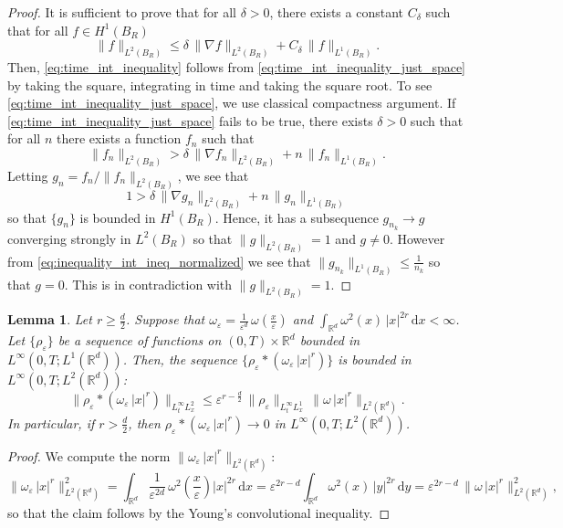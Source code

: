 \documentclass[reqno, 11pt]{amsart}
\numberwithin{equation}{section}
\newtheorem{lem}[thm]{Lemma}
\theoremstyle{definition}
\begin{document}
\begin{proof}
    It is sufficient to prove that for all $\delta > 0$, there exists a constant $C_{\delta}$ such that for all $f \in H^1(B_R)$
    \begin{equation}\label{eq:time_int_inequality_just_space}
        \|f\|_{L^2(B_R)} \leq \delta \, \|\nabla f\|_{L^2(B_R)} + C_{\delta}\, \|f\|_{L^1(B_R)}.
    \end{equation}
    Then, \eqref{eq:time_int_inequality} follows from \eqref{eq:time_int_inequality_just_space} by taking the square, integrating in time and taking the square root. To see \eqref{eq:time_int_inequality_just_space}, we use classical compactness argument. If \eqref{eq:time_int_inequality_just_space} fails to be true, there exists $\delta>0$ such that for all $n$ there exists a function $f_n$ such that
    $$
    \|f_n\|_{L^2(B_R)} > \delta \, \|\nabla f_n\|_{L^2(B_R)} + n\, \|f_n\|_{L^1(B_R)}.
    $$
    Letting $g_n = f_n/\|f_n\|_{L^2(B_R)}$, we see that
    \begin{equation}\label{eq:inequality_int_ineq_normalized}
        1 > \delta \, \|\nabla g_n\|_{L^2(B_R)} + n\, \|g_n\|_{L^1(B_R)}
    \end{equation}
    so that $\{g_n\}$ is bounded in $H^1(B_R)$. Hence, it has a subsequence $g_{n_k} \to g$ converging strongly in $L^2(B_R)$ so that $\|g\|_{L^2(B_R)} = 1$ and $g \neq 0$. However from \eqref{eq:inequality_int_ineq_normalized} we see that $\|g_{n_k}\|_{L^1(B_R)} \leq \frac{1}{n_k}$ so that $g = 0$. This is in contradiction with $\|g\|_{L^2(B_R)} = 1$.
\end{proof}

\begin{lem}\label{lem:conv_mollifiers_scaled_x}
    Let $r\geq \frac{d}{2}$. Suppose that $\omega_{\varepsilon} = \frac{1}{\varepsilon^d}\, \omega\left(\frac{x}{\varepsilon}\right)$ and $\int_{\mathbb{R}^d} \omega^2(x)\, |x|^{2r} \,\mathrm{d} x < \infty$. Let $\{\rho_{\varepsilon}\}$ be a sequence of functions on $(0,T)\times\mathbb{R}^d$ bounded in $L^{\infty}(0,T; L^1(\mathbb{R}^d))$. Then, the sequence $\{\rho_{\varepsilon} \ast (\omega_{\varepsilon}\,|x|^r)\}$ is bounded in $L^{\infty}(0,T; L^2(\mathbb{R}^d))$:
    $$
    \| \rho_{\varepsilon} \ast (\omega_{\varepsilon}\,|x|^r) \|_{L_t^{\infty}L_x^2} \leq  \varepsilon^{r-\frac{d}{2}}\, \| \rho_{\varepsilon}\|_{L_t^\infty L_x^1}\, \| \omega\,|x|^r\|_{L^2(\mathbb{R}^d)}.
    $$
    In particular, if  $r > \frac{d}{2}$, then
    $\rho_{\varepsilon} \ast (\omega_{\varepsilon}\,|x|^r) \to 0$ in $L^{\infty}(0,T; L^2(\mathbb{R}^d))$.
\end{lem}
\begin{proof} We compute the norm
    $\| \omega_{\varepsilon}\,|x|^{r} \|_{L^2(\mathbb{R}^d)}$:
    $$
    \| \omega_{\varepsilon}\,|x|^{r} \|_{L^2(\mathbb{R}^d)}^2 = \int_{\mathbb{R}^d} \frac{1}{\varepsilon^{2d}} \, \omega^2 \left(\frac{x}{\varepsilon}\right) |x|^{2r} \,\mathrm{d} x = \varepsilon^{2r-d} \int_{\mathbb{R}^d} \omega^2(x) \, |y|^{2r} \,\mathrm{d} y = \varepsilon^{2r-d} \, \| \omega\,|x|^r\|_{L^2(\mathbb{R}^d)}^2,
    $$
    so that the claim follows by the Young's convolutional inequality.
\end{proof}
\end{document}
